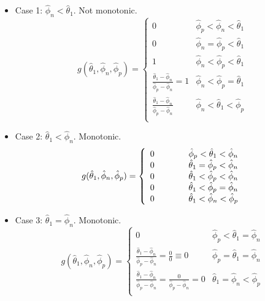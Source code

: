 \begin{itemize}
	\item Case 1: \( \hat{\phi}_n < \hat{\theta}_1 \). Not monotonic. \\
\begin{equation}
g(\hat{\theta}_1, \hat{\phi}_n, \hat{\phi}_p)
=
\left\{
\begin{array}{ll}
0 & \hat{\phi}_p < \hat{\phi}_n < \hat{\theta}_1  \\
0 & \hat{\phi}_n = \hat{\phi}_p < \hat{\theta}_1 \\
1 &	\hat{\phi}_n < \hat{\phi}_p < \hat{\theta}_1 \\
\frac{\hat{\theta}_1 - \hat{\phi}_n}{\hat{\phi}_p - \hat{\phi}_n} = 1 & \hat{\phi}_n < \hat{\phi}_p = \hat{\theta}_1 \\
\frac{\hat{\theta}_1 - \hat{\phi}_n}{\hat{\phi}_p - \hat{\phi}_n} & \hat{\phi}_n < \hat{\theta}_1 < \hat{\phi}_p \\
\end{array}
\right.
\end{equation}

\item Case 2: \( \hat{\theta}_1 < \hat{\phi}_n \). Monotonic. \\
\begin{equation}
g(\hat{\theta}_1, \hat{\phi}_n, \hat{\phi}_p)
=
\left\{
\begin{array}{ll}
0 \hspace*{3em} & \hat{\phi}_p < \hat{\theta}_1 < \hat{\phi}_n  \\
0 & \hat{\theta}_1 = \hat{\phi}_p < \hat{\phi}_n \\
0 &	\hat{\theta}_1 < \hat{\phi}_p < \hat{\phi}_n \\
0 & \hat{\theta}_1 < \hat{\phi}_p = \hat{\phi}_n \\
0 & \hat{\theta}_1 < \hat{\phi}_n < \hat{\phi}_p \\
\end{array}
\right.
\end{equation}

\item Case 3: \( \hat{\theta}_1 = \hat{\phi}_n \). Monotonic. \\
\begin{equation}
g(\hat{\theta}_1, \hat{\phi}_n, \hat{\phi}_p)
=
\left\{
\begin{array}{ll}
0 & \hat{\phi}_p < \hat{\theta}_1 = \hat{\phi}_n	\\
\frac{\hat{\theta}_1 - \hat{\phi}_n}{\hat{\phi}_p - \hat{\phi}_n} = \frac{0}{0} \equiv 0 & \hat{\phi}_p = \hat{\theta}_1 = \hat{\phi}_n 	\\
\frac{\hat{\theta}_1 - \hat{\phi}_n}{\hat{\phi}_p - \hat{\phi}_n} = \frac{0}{\hat{\phi}_p - \hat{\phi}_n} = 0 & \hat{\theta}_1 = \hat{\phi}_n < \hat{\phi}_p	\\
\end{array}
\right.
\end{equation}
\end{itemize}

